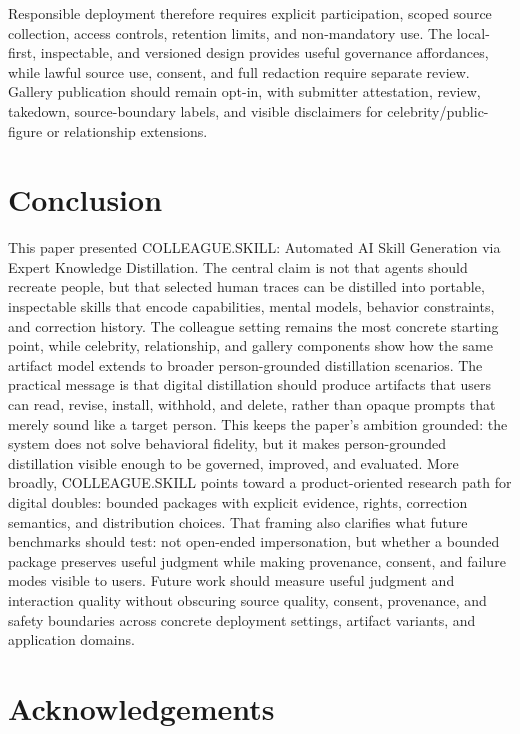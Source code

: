 \documentclass{llmxive}
\providecommand{\system}{\textsc{COLLEAGUE.SKILL}\xspace}
\begin{document}
Responsible deployment therefore requires explicit participation, scoped source collection, access controls, retention limits, and non-mandatory use. The local-first, inspectable, and versioned design provides useful governance affordances, while lawful source use, consent, and full redaction require separate review. Gallery publication should remain opt-in, with submitter attestation, review, takedown, source-boundary labels, and visible disclaimers for celebrity/public-figure or relationship extensions.

\section{Conclusion}

This paper presented \textsc{COLLEAGUE.SKILL}: Automated AI Skill Generation via Expert Knowledge Distillation. The central claim is not that agents should recreate people, but that selected human traces can be distilled into portable, inspectable skills that encode capabilities, mental models, behavior constraints, and correction history. The colleague setting remains the most concrete starting point, while celebrity, relationship, and gallery components show how the same artifact model extends to broader person-grounded distillation scenarios. The practical message is that digital distillation should produce artifacts that users can read, revise, install, withhold, and delete, rather than opaque prompts that merely sound like a target person. This keeps the paper's ambition grounded: the system does not solve behavioral fidelity, but it makes person-grounded distillation visible enough to be governed, improved, and evaluated. More broadly, \system points toward a product-oriented research path for digital doubles: bounded packages with explicit evidence, rights, correction semantics, and distribution choices. That framing also clarifies what future benchmarks should test: not open-ended impersonation, but whether a bounded package preserves useful judgment while making provenance, consent, and failure modes visible to users. Future work should measure useful judgment and interaction quality without obscuring source quality, consent, provenance, and safety boundaries across concrete deployment settings, artifact variants, and application domains.


\section*{Acknowledgements}
\end{document}
